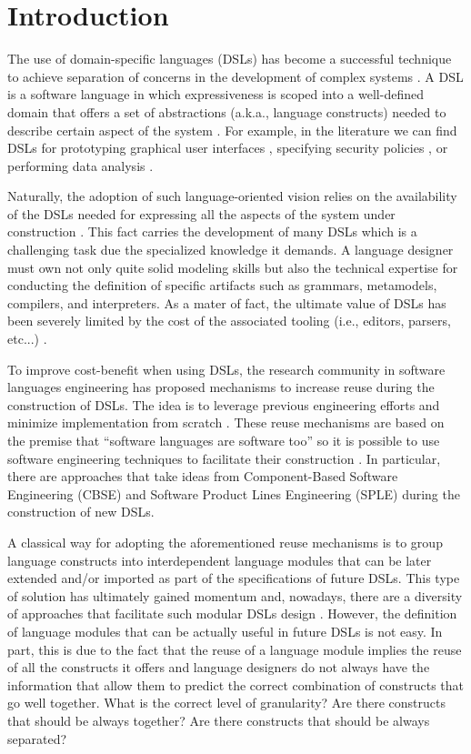 \section{Introduction}
\label{sec:introduction}

The use of domain-specific languages (DSLs) has become a successful technique to achieve separation of concerns in the development of complex systems \cite{Cook:2006}. A DSL is a software language in which expressiveness is scoped into a well-defined domain that offers a set of abstractions (a.k.a., language constructs) needed to describe certain aspect of the system \cite{Combemale:2014}. For example, in the literature we can find DSLs for prototyping graphical user interfaces \cite{Oney:2012}, specifying security policies \cite{Lodderstedt:2002}, or performing data analysis \cite{Eberius:2012}. 

Naturally, the adoption of such language-oriented vision relies on the availability of the DSLs needed for expressing all the aspects of the system under construction \cite{Clark:2013}. This fact carries the development of many DSLs which is a challenging task due the specialized knowledge it demands. A language designer must own not only quite solid modeling skills but also the technical expertise for conducting the definition of specific artifacts such as grammars, metamodels, compilers, and interpreters. As a mater of fact, the ultimate value of DSLs has been severely limited by the cost of the associated tooling (i.e., editors, parsers, etc...) \cite{jezequel:2014}.

To improve cost-benefit when using DSLs, the research community in software languages engineering has proposed mechanisms to increase reuse during the construction of DSLs. The idea is to leverage previous engineering efforts and minimize implementation from scratch \cite{Storm:2013}. These reuse mechanisms are based on the premise that ``software languages are software too'' \cite{Favre:2011} so it is possible to use software engineering techniques to facilitate their construction \cite{Kleppe:2009}. In particular, there are approaches that take ideas from Component-Based Software Engineering (CBSE) \cite{Cleenewerck:2003} and Software Product Lines Engineering (SPLE)  \cite{Zschaler:2010} during the construction of new DSLs.

A classical way for adopting the aforementioned reuse mechanisms is to group language constructs into interdependent language modules that can be later extended and/or imported as part of the specifications of future DSLs. This type of solution has ultimately gained momentum and, nowadays, there are a diversity of approaches that facilitate such modular DSLs design \cite{Vacchi:2015,Mernik:2013,Rumpe:2010}. However, the definition of language modules that can be actually useful in future DSLs is not easy. In part, this is due to the fact that the reuse of a language module implies the reuse of all the constructs it offers and language designers do not always have the information that allow them to predict the correct combination of constructs that go well together. What is the correct level of granularity? Are there constructs that should be always together? Are there constructs that should be always separated?


